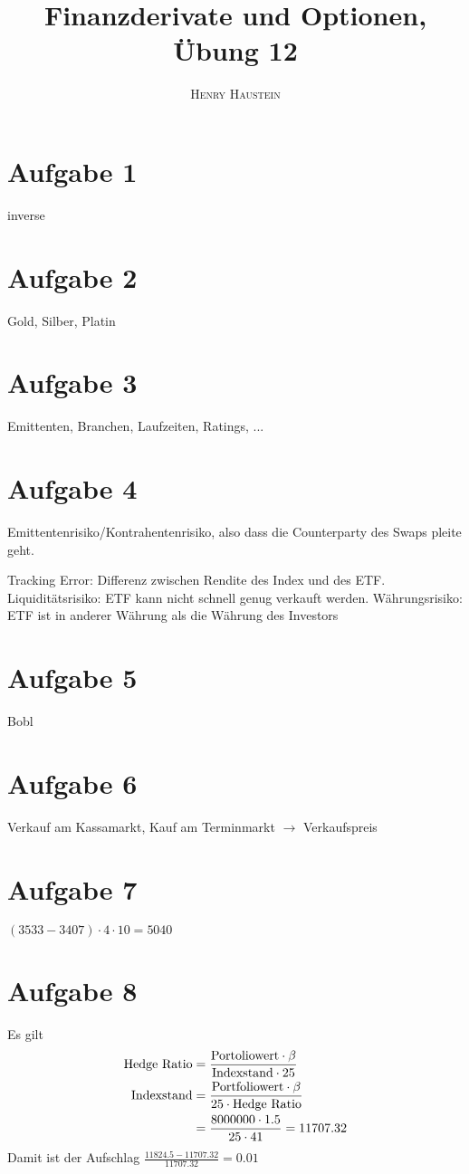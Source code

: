 \documentclass{article}
\title{\textbf{Finanzderivate und Optionen, Übung 12}}
\author{\textsc{Henry Haustein}}
\date{}
\begin{document}
	\maketitle
	
	\section*{Aufgabe 1}
	inverse	

	\section*{Aufgabe 2}
	Gold, Silber, Platin
	
	\section*{Aufgabe 3}
	Emittenten, Branchen, Laufzeiten, Ratings, ...
	
	\section*{Aufgabe 4}
	Emittentenrisiko/Kontrahentenrisiko, also dass die Counterparty des Swaps pleite geht.
	
	Tracking Error: Differenz zwischen Rendite des Index und des ETF.
	Liquiditätsrisiko: ETF kann nicht schnell genug verkauft werden.
	Währungsrisiko: ETF ist in anderer Währung als die Währung des Investors
	
	\section*{Aufgabe 5}
	Bobl
	
	\section*{Aufgabe 6}
	Verkauf am Kassamarkt, Kauf am Terminmarkt $\to$ Verkaufspreis
	
	\section*{Aufgabe 7}
	$(3533 - 3407)\cdot 4\cdot 10 = 5040$
	
	\section*{Aufgabe 8}
	Es gilt
	\begin{align}
		\text{Hedge Ratio} &= \frac{\text{Portoliowert}\cdot \beta}{\text{Indexstand}\cdot 25} \notag \\
		\text{Indexstand} &= \frac{\text{Portfoliowert}\cdot\beta}{25\cdot \text{Hedge Ratio}} \notag \\
		&= \frac{8000000\cdot 1.5}{25\cdot 41} = 11707.32 \notag
	\end{align}
	Damit ist der Aufschlag $\frac{11824.5 - 11707.32}{11707.32} = 0.01$
	
\end{document}
